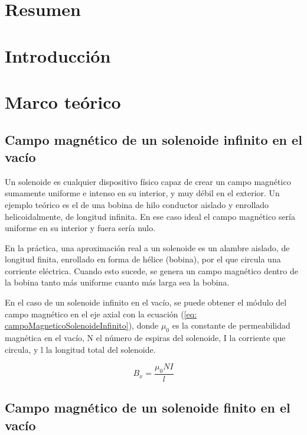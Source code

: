 \documentclass[a4paper,12pt]{article}
\begin{document}
\section*{Resumen}

    

\section*{Introducción}

    

\section*{Marco teórico}

    \subsection*{Campo magnético de un solenoide infinito en el vacío}

        Un solenoide es cualquier dispositivo físico capaz de crear un campo magnético sumamente uniforme e intenso en su interior, y muy débil en el exterior. Un ejemplo teórico es el de una bobina de hilo conductor aislado y enrollado helicoidalmente, de longitud infinita. En ese caso ideal el campo magnético sería uniforme en su interior y fuera sería nulo.

        En la práctica, una aproximación real a un solenoide es un alambre aislado, de longitud finita, enrollado en forma de hélice (bobina), por el que circula una corriente eléctrica. Cuando esto sucede, se genera un campo magnético dentro de la bobina tanto más uniforme cuanto más larga sea la bobina.

        En el caso de un solenoide infinito en el vacío, se puede obtener el módulo del campo magnético en el eje axial con la ecuación (\ref{eq: campoMagneticoSolenoideInfinito}), donde $\mu_0$ es la constante de permeabilidad magnética en el vacío, N el número de espiras del solenoide, I la corriente que circula, y l la longitud total del solenoide.

        \begin{equation}
            \label{eq: campoMagneticoSolenoideInfinito}
            B_x = \frac{\mu_0 N I}{l}
        \end{equation}

    \subsection*{Campo magnético de un solenoide finito en el vacío}
    
\end{document}
